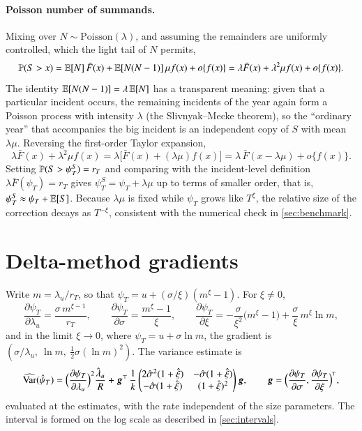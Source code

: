 \paragraph{Poisson number of summands.} Mixing over $N \sim \mathrm{Poisson}(\lambda)$, and assuming the remainders are uniformly controlled, which the light tail of $N$ permits,
\[
\mathbb{P}(S > x) = \mathbb{E}[N]\,\bar F(x) + \mathbb{E}[N(N-1)]\,\mu f(x) + o\{f(x)\} = \lambda\bar F(x) + \lambda^2\mu f(x) + o\{f(x)\}.
\]
The identity $\mathbb{E}[N(N-1)] = \lambda\,\mathbb{E}[N]$ has a transparent meaning: given that a particular incident occurs, the remaining incidents of the year again form a Poisson process with intensity $\lambda$ (the Slivnyak--Mecke theorem), so the ``ordinary year'' that accompanies the big incident is an independent copy of $S$ with mean $\lambda\mu$. Reversing the first-order Taylor expansion,
\[
\lambda\bar F(x) + \lambda^2\mu f(x) = \lambda\big[\bar F(x) + (\lambda\mu) f(x)\big] = \lambda\,\bar F(x - \lambda\mu) + o\{f(x)\}.
\]
Setting $\mathbb{P}(S > \psi^S_T) = r_T$ and comparing with the incident-level definition $\lambda\bar F(\psi_T) = r_T$ gives $\psi^S_T = \psi_T + \lambda\mu$ up to terms of smaller order, that is, $\psi^S_T \approx \psi_T + \mathbb{E}[S]$. Because $\lambda\mu$ is fixed while $\psi_T$ grows like $T^{\xi}$, the relative size of the correction decays as $T^{-\xi}$, consistent with the numerical check in \cref{sec:benchmark}.

\section{Delta-method gradients}\label{app:gradients}

Write $m = \lambda_u/r_T$, so that $\psi_T = u + (\sigma/\xi)(m^{\xi}-1)$. For $\xi \neq 0$,
\[
\frac{\partial\psi_T}{\partial\lambda_u} = \frac{\sigma\, m^{\xi-1}}{r_T},\qquad
\frac{\partial\psi_T}{\partial\sigma} = \frac{m^{\xi}-1}{\xi},\qquad
\frac{\partial\psi_T}{\partial\xi} = -\frac{\sigma}{\xi^{2}}\big(m^{\xi}-1\big) + \frac{\sigma}{\xi}\, m^{\xi}\ln m ,
\]
and in the limit $\xi \to 0$, where $\psi_T = u + \sigma\ln m$, the gradient is $(\sigma/\lambda_u,\ \ln m,\ \tfrac12\sigma(\ln m)^2)$. The variance estimate is
\[
\widehat{\operatorname{Var}}(\hat\psi_T) = \Big(\frac{\partial\psi_T}{\partial\lambda_u}\Big)^{2}\frac{\hat\lambda_u}{R} + \bm{g}^{\top}\,\frac{1}{k}\begin{pmatrix} 2\hat\sigma^2(1+\hat\xi) & -\hat\sigma(1+\hat\xi)\\ -\hat\sigma(1+\hat\xi) & (1+\hat\xi)^2\end{pmatrix}\bm{g},\qquad \bm{g} = \Big(\frac{\partial\psi_T}{\partial\sigma},\frac{\partial\psi_T}{\partial\xi}\Big)^{\!\top},
\]
evaluated at the estimates, with the rate independent of the size parameters. The interval is formed on the log scale as described in \cref{sec:intervals}.

